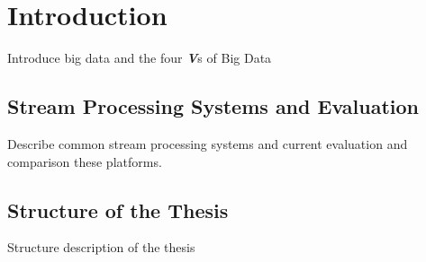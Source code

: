 \chapter{Introduction}
\label{chapter:intro}

Introduce big data and the four \textbf{\textit{V}}s of Big Data 

\section{Stream Processing Systems and Evaluation}
\label{section:big_data_analytics}

Describe common stream processing systems and current evaluation and comparison these platforms. 

\section{Structure of the Thesis}
\label{section:structure} 

Structure description of the thesis

\clearpage
